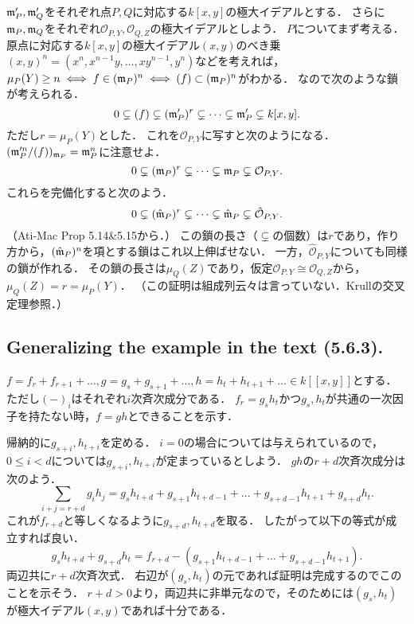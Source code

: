 \documentclass[a4paper]{jsarticle}
\begin{document}
    $\mathfrak{m}'_P, \mathfrak{m}'_Q$をそれぞれ点$P,Q$に対応する$k[x,y]$の極大イデアルとする．
    さらに$\mathfrak{m}_P, \mathfrak{m}_Q$をそれぞれ$\mathcal{O}_{P,Y}, \mathcal{O}_{Q,Z}$の極大イデアルとしよう．
    $P$についてまず考える．
    原点に対応する$k[x,y]$の極大イデアル$(x,y)$のべき乗$(x,y)^n=(x^n,x^{n-1}y,\dots,xy^{n-1},y^n)$などを考えれば，
    $\mu_{P}(Y) \geq n \iff f \in (\mathfrak{m}_P)^n \iff (f) \subset (\mathfrak{m}_P)^n$がわかる．
    なので次のような鎖が考えられる．
    \[ 0 \subsetneq (f) \subsetneq (\mathfrak{m}'_P)^r \subsetneq \dots \subsetneq \mathfrak{m}'_P \subsetneq k[x,y]. \]
    ただし$r=\mu_{P}(Y)$とした．
    これを$\mathcal{O}_{P,Y}$に写すと次のようになる．
    $(\mathfrak{m}'^n_P/(f))_{\mathfrak{m}_P}=\mathfrak{m}^n_P$に注意せよ．
    \[ 0 \subsetneq (\mathfrak{m}_P)^r \subsetneq \dots \subsetneq \mathfrak{m}_P \subsetneq \mathcal{O}_{P,Y}. \]
    これらを完備化すると次のよう．
    \[ 0 \subsetneq (\hat{\mathfrak{m}}_P)^r \subsetneq \dots \subsetneq \hat{\mathfrak{m}}_P \subsetneq \hat{\mathcal{O}}_{P,Y}. \]
    （Ati-Mac Prop 5.14\&5.15から．）
    この鎖の長さ（$\subsetneq$の個数）は$r$であり，作り方から，$(\hat{\mathfrak{m}}_P)^n$を項とする鎖はこれ以上伸ばせない．
    一方，$\hat{\mathcal{O}}_{P,Y}$についても同様の鎖が作れる．
    その鎖の長さは$\mu_{Q}(Z)$であり，仮定$\mathcal{O}_{P,Y} \cong \mathcal{O}_{Q,Z}$から，$\mu_{Q}(Z)=r=\mu_{P}(Y)$．
    （この証明は組成列云々は言っていない．Krullの交叉定理参照．）

    \subsection{Generalizing the example in the text (5.6.3).}
    $f=f_{r}+f_{r+1}+\dots, g=g_{s}+g_{s+1}+\dots, h=h_{t}+h_{t+1}+\dots \in k[[x,y]]$とする．
    ただし$({-})_{i}$はそれぞれ$i$次斉次成分である．
    $f_{r}=g_{s} h_{t}$かつ$g_{s}, h_{t}$が共通の一次因子を持たない時，$f=gh$とできることを示す．

    帰納的に$g_{s+i}, h_{t+i}$を定める．
    $i=0$の場合については与えられているので，$0 \leq i<d$については$g_{s+i}, h_{t+i}$が定まっているとしよう．
    $gh$の$r+d$次斉次成分は次のよう．
    \[ \sum_{i+j=r+d} g_{i} h_{j}=g_{s}h_{t+d}+g_{s+1}h_{t+d-1}+\dots+g_{s+d-1}h_{t+1}+g_{s+d}h_{t}. \]
    これが$f_{r+d}$と等しくなるように$g_{s+d},h_{t+d}$を取る．
    したがって以下の等式が成立すれば良い．
    \[ g_{s}h_{t+d}+g_{s+d}h_{t}=f_{r+d}-(g_{s+1}h_{t+d-1}+\dots+g_{s+d-1}h_{t+1}). \]
    両辺共に$r+d$次斉次式．
    右辺が$(g_s, h_t)$の元であれば証明は完成するのでこのことを示そう．
    $r+d>0$より，両辺共に非単元なので，そのためには$(g_s, h_t)$が極大イデアル$(x,y)$であれば十分である．
\end{document}
